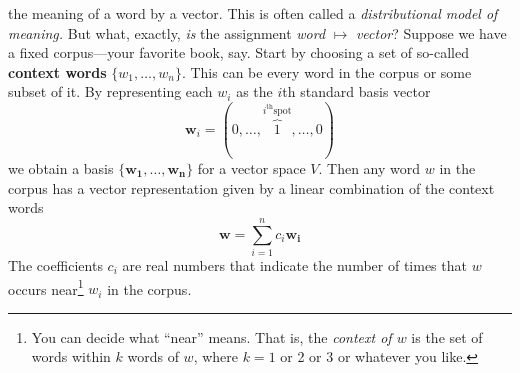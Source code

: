 \documentclass{tufte-handout-tai}
\theoremstyle{plain}
\theoremstyle{definition}
\theoremstyle{remark}
\begin{document}
 the meaning of a word by a vector. This is often called a \textit{distributional model of meaning.} But what, exactly, \textit{is} the assignment \textit{word} $\mapsto$ \textit{vector}? Suppose we have a fixed corpus---your favorite book, say. Start by choosing a set of so-called \textbf{context words} $\{w_1,\ldots, w_n\}$. This can be every word in the corpus or some subset of it. By representing each $w_i$ as the $i$th standard basis vector
\[\mathbf{w}_i=(0,\ldots,\overbrace{1}^{i^\text{th} \text{spot}},\ldots,0)\]
we obtain a basis $\{\mathbf{w_1},\ldots, \mathbf{w_n}\}$ for a vector space $V$. Then any word $w$ in the corpus has a vector representation given by a linear combination of the context words
\[\mathbf{w}=\sum_{i=1}^n c_i\mathbf{w_i}\]
The coefficients $c_i$ are real numbers that indicate the number of times that $w$ occurs near\footnote{You can decide what ``near'' means. That is, the \textit{context of $w$} is the set of words within $k$ words of $w$, where $k=1$ or 2 or 3 or whatever you like.} $w_i$ in the corpus. 
\end{document}
